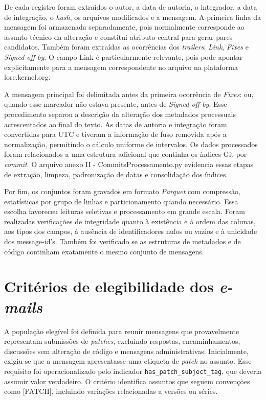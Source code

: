 De cada registro foram extraídos o autor, a data de autoria, o integrador, a data de integração, o \textit{hash}, os arquivos modificados e a mensagem. A primeira linha da mensagem foi armazenada separadamente, pois normalmente corresponde ao assunto técnico da alteração e constitui atributo central para gerar pares candidatos. Também foram extraídas as ocorrências dos \textit{trailers}: \textit{Link}, \textit{Fixes} e \textit{Signed-off-by}. O campo Link é particularmente relevante, pois pode apontar explicitamente para a mensagem correspondente no arquivo na plataforma lore.kernel.org.

A mensagem principal foi delimitada antes da primeira ocorrência de \textit{Fixes}: ou, quando esse marcador não estava presente, antes de \textit{Signed-off-by}. Esse procedimento separou a descrição da alteração dos metadados processuais acrescentados ao final do texto. As datas de autoria e integração foram convertidas para UTC e tiveram a informação de fuso removida após a normalização, permitindo o cálculo uniforme de intervalos. Os dados processados foram relacionados a uma estrutura adicional que continha os índices Git por \textit{commit}. O arquivo anexo II - CommitsProcessamento.py evidencia essas etapas de extração, limpeza, padronização de datas e consolidação dos índices.

Por fim, os conjuntos foram gravados em formato \textit{Parquet} com compressão, estatísticas por grupo de linhas e particionamento quando necessário. Essa escolha favoreceu leituras seletivas e processamento em grande escala. Foram realizadas verificações de integridade quanto à existência e à ordem das colunas, aos tipos dos campos, à ausência de identificadores nulos ou vazios e à unicidade dos message-id's. Também foi verificado se as estruturas de metadados e de código continham exatamente o mesmo conjunto de mensagens.


\section{Critérios de elegibilidade dos \textit{e-mails}}
A população elegível foi definida para reunir mensagens que provavelmente representam submissões de \textit{patches}, excluindo respostas, encaminhamentos, discussões sem alteração de código e mensagens administrativas. Inicialmente, exigiu-se que a mensagem apresentasse uma etiqueta de \textit{patch} no assunto. Esse requisito foi operacionalizado pelo indicador \texttt{has\_patch\_subject\_tag}, que deveria assumir valor verdadeiro. O critério identifica assuntos que seguem convenções como [PATCH], incluindo variações relacionadas a versões ou séries.

